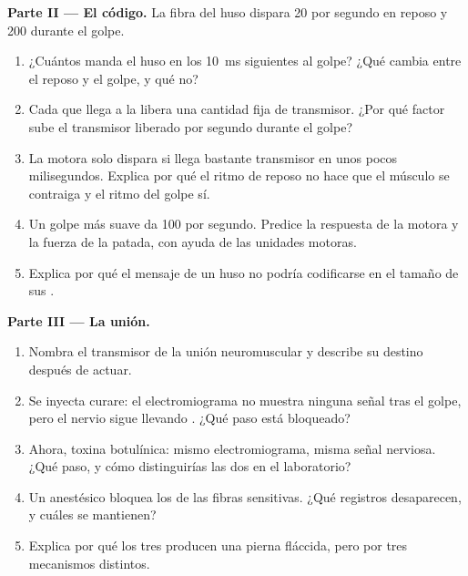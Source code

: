 \begin{problem}
\medskip
\noindent\textbf{Parte II --- El código.}
La fibra del huso dispara 20  por segundo en
reposo y 200 durante el golpe.
\begin{enumerate}[resume]
  \item ¿Cuántos  manda el huso en los
        \qty{10}{ms} siguientes al golpe? ¿Qué cambia entre el reposo y
        el golpe, y qué no?
  \item Cada  que llega a la  libera una
        cantidad fija de transmisor. ¿Por qué factor sube el transmisor
        liberado por segundo durante el golpe?
  \item La  motora solo dispara si llega bastante transmisor en
        unos pocos milisegundos. Explica por qué el ritmo de reposo no
        hace que el músculo se contraiga y el ritmo del golpe sí.
  \item Un golpe más suave da 100 por segundo. Predice la respuesta de
        la  motora y la fuerza de la patada, con ayuda de las
        unidades motoras.
  \item Explica por qué el mensaje de un huso no podría codificarse en
        el tamaño de sus .
\end{enumerate}

\medskip
\noindent\textbf{Parte III --- La unión.}
\begin{enumerate}[resume]
  \item Nombra el transmisor de la unión neuromuscular y describe su
        destino después de actuar.
  \item Se inyecta curare: el electromiograma no muestra ninguna señal
        tras el golpe, pero el nervio sigue llevando . ¿Qué paso está bloqueado?
  \item Ahora, toxina botulínica: mismo electromiograma, misma señal
        nerviosa. ¿Qué paso, y cómo distinguirías las dos en el
        laboratorio?
  \item Un anestésico bloquea los  de las fibras
        sensitivas. ¿Qué registros desaparecen, y cuáles se mantienen?
  \item Explica por qué los tres producen una pierna fláccida, pero por
        tres mecanismos distintos.
\end{enumerate}


\end{problem}
